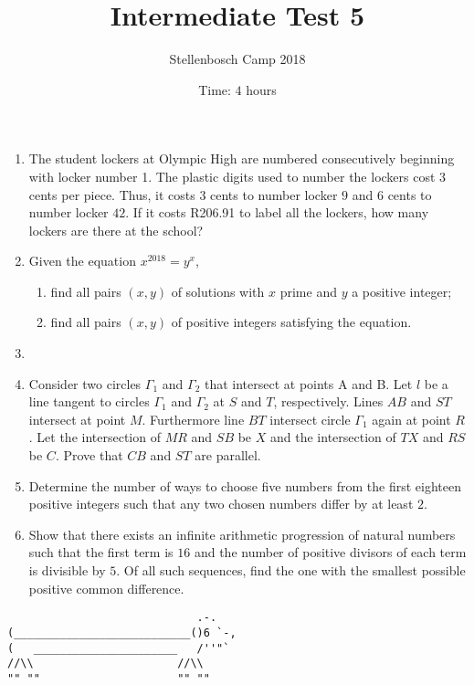 \documentclass{article}
\title{Intermediate Test 5}
\author{Stellenbosch Camp 2018}
\date{Time: $4$ hours}
\begin{document}
 \maketitle

\begin{enumerate}[1.]

\item %
The student lockers at Olympic High are numbered consecutively beginning with locker number 1. The plastic digits used to number the lockers cost $3$ cents per piece. Thus, it costs $3$ cents to number locker $9$ and $6$ cents to number locker $42$. If it costs R206.91 to label all the lockers, how many lockers are there at the school?


\vspace{6pt}
\item %
Given the equation $x^{2018} = y^x$,
\begin{enumerate}
  \item find all pairs $(x,y)$ of solutions with $x$ prime and $y$ a positive integer;
  \item find all pairs $(x,y)$ of positive integers satisfying the equation.
\end{enumerate}


\vspace{6pt}
\item %


\vspace{6pt}
\item %
Consider two circles $\Gamma_1$ and $\Gamma_2$ that intersect at points A and B. Let $l$ be a line tangent to circles $\Gamma_1$ and $\Gamma_2$ at $S$ and $T$, respectively. Lines $AB$ and $ST$ intersect at point $M$. Furthermore line $BT$ intersect circle $\Gamma_1$ again at point $R$. Let the intersection of $MR$ and $SB$ be $X$ and the intersection of $TX$ and $RS$ be $C$. 
Prove that $CB$ and $ST$ are parallel.  


\vspace{6pt}
\item %
Determine the number of ways to choose five numbers from the first eighteen positive integers such that any two chosen numbers differ by at least $2$.


\vspace{6pt}
\item %
Show that there exists an infinite arithmetic progression of natural numbers such that the first term is $16$ and the number of positive divisors of each term is divisible by $5$. Of all such sequences, find the one with the smallest possible positive common difference.


\end{enumerate}


\vfill
\centering
\begin{BVerbatim}
                             .-.
(___________________________()6 `-,
(   ______________________   /''"`
//\\                      //\\
"" ""                     "" ""
\end{BVerbatim}
\end{document}
